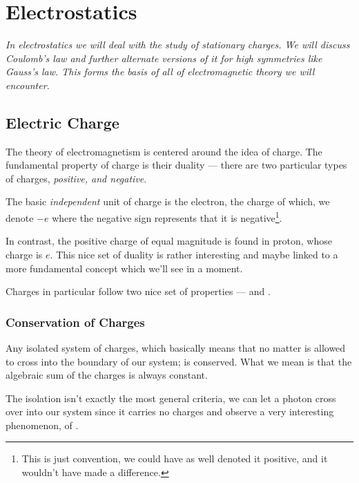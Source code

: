 \chapter{Electrostatics}
\margintoc


\emph{In electrostatics we will deal with the study of stationary charges. We will 
discuss Coulomb's law and further alternate versions of it 
for high symmetries like Gauss's law. This forms the basis of all 
of electromagnetic theory we will encounter.}

\section{Electric Charge}

The theory of electromagnetism is centered around the idea of charge. The 
fundamental property of charge is their duality --- there are two 
particular types of charges, \emph{positive, and negative}. 

The basic \emph{independent} unit of charge is the electron, the charge of which, 
we denote \(-e\) where the negative sign represents that it is negative\footnote{This
is just convention, we could have as well denoted it positive, and it wouldn't 
have made a difference.}. 

In contrast, the positive charge of equal magnitude is found in proton, 
whose charge is \(e\). This nice set of duality is rather interesting and maybe 
linked to a more fundamental concept which we'll see in a moment. 

Charges in particular follow two nice set of properties ---  and 
.

\subsection{Conservation of Charges}

Any isolated system of charges, which basically means that no matter is allowed 
to cross into the boundary of our system; is conserved. What we mean is that the 
algebraic sum of the charges is always constant.

The isolation isn't exactly the most general criteria, we can let a photon 
cross over into our system since it carries no charges and observe a very interesting 
phenomenon, of . 


